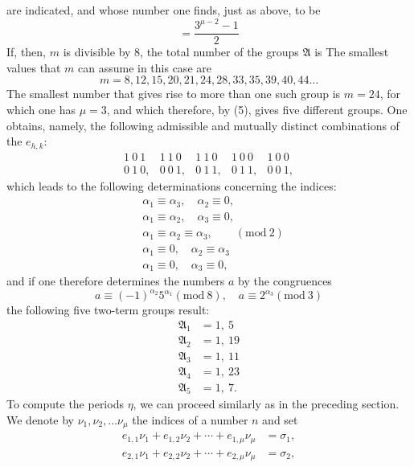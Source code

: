are indicated, and whose number one finds, just as above, to be
\[
= \frac{3^{\mu - 2} - 1}{2}
\]
If, then, $m$ is divisible by 8, the total number of the groups $\mathfrak{A}$ is
The smallest values that $m$ can assume in this case are
\[
m = 8, 12, 15, 20, 21, 24, 28, 33, 35, 39, 40, 44 \ldots
\]
The smallest number that gives rise to more than one such group is $m = 24$, for which one has $\mu = 3$, and which therefore, by (5), gives five different groups. One obtains, namely, the following admissible and mutually distinct combinations of the $e_{h,k}$: %
\[
\begin{array}{ccccc}
1\ 0\ 1 & 1\ 1\ 0 & 1\ 1\ 0 & 1\ 0\ 0 & 1\ 0\ 0\\
0\ 1\ 0, & 0\ 0\ 1, & 0\ 1\ 1, & 0\ 1\ 1, & 0\ 0\ 1,
\end{array}
\]
which leads to the following determinations concerning the indices:
\[
\begin{aligned}
& \alpha_1 \equiv \alpha_3,\quad \alpha_2 \equiv 0,\\
& \alpha_1 \equiv \alpha_2,\quad \alpha_3 \equiv 0,\\
& \alpha_1 \equiv \alpha_2 \equiv \alpha_3,\qquad (\mathrm{mod}\ 2)\\
& \alpha_1 \equiv 0,\quad \alpha_2 \equiv \alpha_3\\
& \alpha_1 \equiv 0,\quad \alpha_3 \equiv 0,
\end{aligned}
\]
and if one therefore determines the numbers $a$ by the congruences
\[
a \equiv (-1)^{\alpha_2} 5^{\alpha_1} (\mathrm{mod}\ 8), \quad a \equiv 2^{\alpha_3} (\mathrm{mod}\ 3)
\]
the following five two-term groups result:
\[
\begin{aligned}
\mathfrak{A}_1 &= 1,\ 5\\
\mathfrak{A}_2 &= 1,\ 19\\
\mathfrak{A}_3 &= 1,\ 11\\
\mathfrak{A}_4 &= 1,\ 23\\
\mathfrak{A}_5 &= 1,\ 7.
\end{aligned}
\]
To compute the periods $\eta$, we can proceed similarly as in the preceding section. We denote by $\nu_1, \nu_2, \ldots \nu_\mu$ the indices of a number $n$ and set
\[
\begin{aligned}
e_{1,1} \nu_1 + e_{1,2} \nu_2 + \cdots + e_{1,\mu} \nu_\mu &= \sigma_1,\\
e_{2,1} \nu_1 + e_{2,2} \nu_2 + \cdots + e_{2,\mu} \nu_\mu &= \sigma_2,
\end{aligned}
\]
